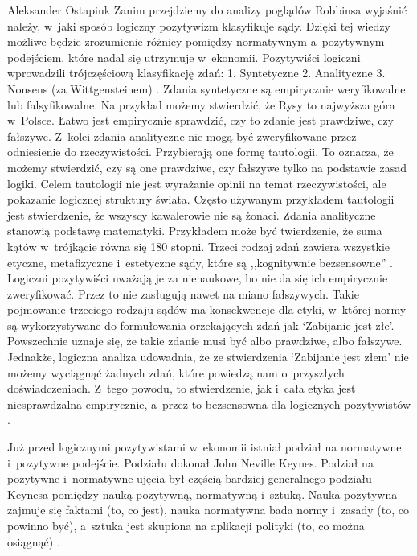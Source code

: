 \begin{artplenv}{Aleksander Ostapiuk}
Zanim przejdziemy do analizy poglądów Robbinsa wyjaśnić należy, w~jaki sposób logiczny pozytywizm klasyfikuje sądy.
Dzięki tej wiedzy możliwe będzie zrozumienie różnicy pomiędzy normatywnym a~pozytywnym podejściem, które nadal się
utrzymuje w~ekonomii. Pozytywiści logiczni wprowadzili trójczęściową klasyfikację zdań: 1. Syntetyczne 2. Analityczne
3. Nonsens (za Wittgensteinem)
\parencite[s.~10 i~18]{putnam_collapse_2002}.
Zdania syntetyczne są empirycznie
weryfikowalne lub falsyfikowalne. Na przykład możemy stwierdzić, że Rysy to najwyższa góra w~Polsce. Łatwo jest
empirycznie sprawdzić, czy to zdanie jest prawdziwe, czy fałszywe. Z~kolei zdania analityczne nie mogą być zweryfikowane
przez odniesienie do rzeczywistości. Przybierają one formę tautologii. To oznacza, że możemy stwierdzić, czy są one
prawdziwe, czy fałszywe tylko na podstawie zasad logiki. Celem tautologii nie jest wyrażanie opinii na temat
rzeczywistości, ale pokazanie logicznej struktury świata. Często używanym przykładem tautologii jest stwierdzenie, że
wszyscy kawalerowie nie są żonaci. Zdania analityczne stanowią podstawę matematyki. Przykładem może być twierdzenie, że
suma kątów w~trójkącie równa się 180 stopni. Trzeci rodzaj zdań zawiera wszystkie etyczne, metafizyczne i~estetyczne
sądy, które są ,,kognitywnie bezsensowne''
\parencite[s.~10]{putnam_collapse_2002}.
Logiczni pozytywiści uważają
je za nienaukowe, bo nie da się ich empirycznie zweryfikować. Przez to nie zasługują nawet na miano fałszywych. Takie
pojmowanie trzeciego rodzaju sądów ma konsekwencje dla etyki, w~której normy są wykorzystywane do formułowania
orzekających zdań jak `Zabijanie jest złe'. Powszechnie uznaje się, że takie zdanie musi być albo prawdziwe, albo
fałszywe. Jednakże, logiczna analiza udowadnia, że ze stwierdzenia `Zabijanie jest złem' nie możemy wyciągnąć żadnych
zdań, które powiedzą nam o~przyszłych doświadczeniach. Z~tego powodu, to stwierdzenie, jak i~cała etyka jest
niesprawdzalna empirycznie, a~przez to bezsensowna dla logicznych pozytywistów
\parencite[s.~25]{carnap_philosophy_1935}.

Już przed logicznymi pozytywistami w~ekonomii istniał podział na normatywne i~pozytywne podejście. Podziału dokonał John
Neville Keynes. Podział na pozytywne i~normatywne ujęcia był częścią bardziej generalnego podziału Keynesa pomiędzy
nauką pozytywną, normatywną i~sztuką. Nauka pozytywna zajmuje się faktami (to, co jest), nauka normatywna bada
normy i~zasady (to, co powinno być), a~sztuka jest skupiona na aplikacji polityki (to, co można osiągnąć)
\parencite[s.~34–35]{keynes_scope_1917}.


\end{artplenv}
